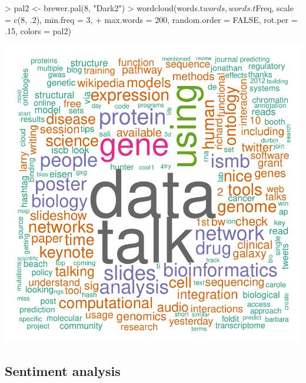 \documentclass[a4paper,10pt]{article}
\begin{document}
\begin{center}
\begin{Schunk}
\begin{Sinput}
> pal2 <- brewer.pal(8, "Dark2")
> wordcloud(words.t$words, words.t$Freq, scale = c(8, .2), min.freq = 3,
+     max.words = 200, random.order = FALSE, rot.per = .15, colors = pal2)
\end{Sinput}
\end{Schunk}
\includegraphics{ismb-013}
\end{center}

\newpage

\subsection{Sentiment analysis}
\end{document}
